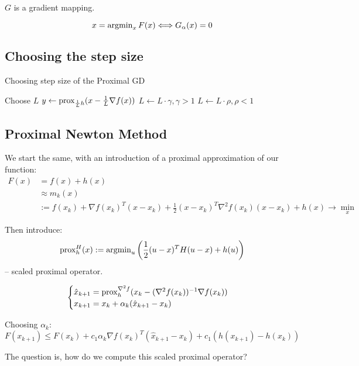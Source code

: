 $G$ is a gradient mapping.

\begin{theorem}
    \[ 
        x = \operatorname{argmin}_x F(x) \Longleftrightarrow G_\alpha(x) = 0
    \] 
\end{theorem}

\subsection{Choosing the step size}

\begin{algorithm}
\caption{Choosing step size of the Proximal GD}
\begin{algorithmic}[1]
\State{} Choose $L$
    \State{} $y \gets \operatorname{prox}_{\frac{1}{L} h} (x - \frac{1}{L} \nabla f(x))$
    \State{} $L \gets L \cdot \gamma, \gamma > 1$
\EndWhile{}
\State{} $L \gets L \cdot \rho, \rho < 1$
\end{algorithmic}
\end{algorithm}

\subsection{Proximal Newton Method}

We start the same, with an introduction of a proximal approximation of our function: 
\begin{align*}
    F(x) &= f(x) + h(x) \\ 
    &\approx m_k(x) \\ 
    &:= f(x_k) + \nabla f(x_k)^T (x - x_k) + \frac{1}{2} (x - x_k)^T \nabla^2 f(x_k) (x - x_k) + h(x) \to \min_x
\end{align*}

Then introduce: 
\[
    \operatorname{prox}_h^H (x) := \operatorname{argmin}_u \left(\frac{1}{2} (u - x)^T H (u - x) + h(u)\right)
\] 
-- scaled proximal operator.

\[ 
    \begin{cases}
        \hat{x}_{k+1} = \operatorname{prox}_{h}^{\nabla^2 f} (x_k - (\nabla^2 f(x_k))^{-1} \nabla f(x_k)) \\ 
        x_{k+1} = x_k + \alpha_k (\hat{x}_{k+1} - x_k)
    \end{cases}
\] 

Choosing $\alpha_k$:
\[ 
    F(x_{k+1}) \leqslant F(x_k) + c_1 \alpha_k \nabla f(x_k)^T (\hat{x}_{k+1} - x_k) + c_1 (h(x_{k+1}) - h(x_k))
\] 

The question is, how do we compute this scaled proximal operator?

